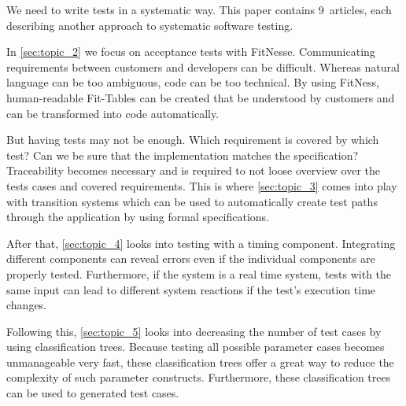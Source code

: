 We need to write tests in a systematic way.
This paper contains 9~articles, %
each describing another approach to systematic software testing.

In \autoref{sec:topic_2} %
we focus on acceptance tests with FitNesse.
Communicating requirements between customers and developers can be difficult.
Whereas natural language can be too ambiguous, code can be too technical.
By using FitNess, human-readable Fit-Tables can be created that be understood by customers and can be transformed into code automatically.

But having tests may not be enough.
Which requirement is covered by which test?
Can we be sure that the implementation matches the specification?
Traceability becomes necessary and is required to not loose overview over the tests cases and covered requirements.
This is where
\autoref{sec:topic_3} %
comes into play with transition systems which can be used to automatically create test paths through the application by using formal specifications.


After that,
\autoref{sec:topic_4} %
looks into testing with a timing component.
Integrating different components can reveal errors even if the individual components are properly tested.
Furthermore, if the system is a real time system, tests with the same input can lead to different system reactions if the test's execution time changes.


Following this,
\autoref{sec:topic_5} %
looks into decreasing the number of test cases by using classification trees.
Because testing all possible parameter cases becomes unmanageable very fast, these classification trees offer a great way to reduce the complexity of such parameter constructs.
Furthermore, these classification trees can be used to generated test cases.


